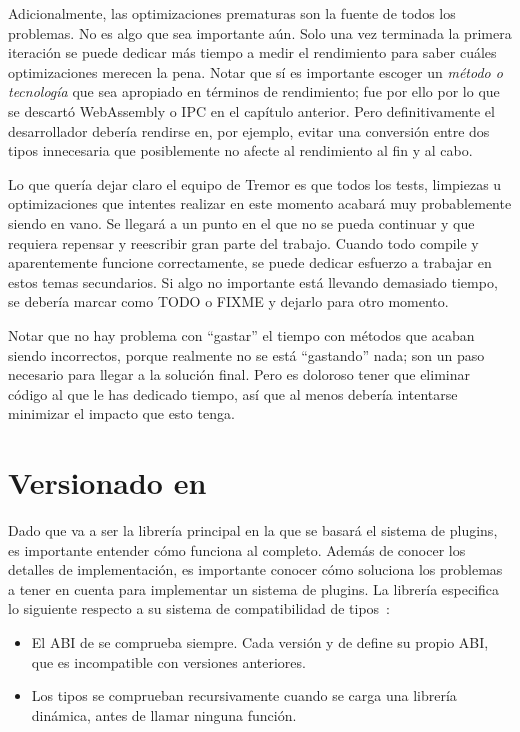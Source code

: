 Adicionalmente, las optimizaciones prematuras son la fuente de todos los
problemas. No es algo que sea importante aún. Solo una vez terminada la primera
iteración se puede dedicar más tiempo a medir el rendimiento para saber cuáles
optimizaciones merecen la pena. Notar que sí es importante escoger un
\emph{método o tecnología} que sea apropiado en términos de rendimiento; fue por
ello por lo que se descartó WebAssembly o IPC en el capítulo anterior. Pero
definitivamente el desarrollador debería rendirse en, por ejemplo, evitar una
conversión entre dos tipos innecesaria que posiblemente no afecte al rendimiento
al fin y al cabo.

Lo que quería dejar claro el equipo de Tremor es que todos los tests, limpiezas
u optimizaciones que intentes realizar en este momento acabará muy probablemente
siendo en vano. Se llegará a un punto en el que no se pueda continuar y que
requiera repensar y reescribir gran parte del trabajo. Cuando todo compile y
aparentemente funcione correctamente, se puede dedicar esfuerzo a trabajar en
estos temas secundarios. Si algo no importante está llevando demasiado tiempo,
se debería marcar como TODO o FIXME y dejarlo para otro momento.

Notar que no hay problema con ``gastar'' el tiempo con métodos que acaban siendo
incorrectos, porque realmente no se está ``gastando'' nada; son un paso
necesario para llegar a la solución final. Pero es doloroso tener que eliminar
código al que le has dedicado tiempo, así que al menos debería intentarse
minimizar el impacto que esto tenga.

\section{Versionado en \abistable}

Dado que \abistable va a ser la librería principal en la que se basará el
sistema de plugins, es importante entender cómo funciona al completo. Además de
conocer los detalles de implementación, es importante conocer cómo \abistable
soluciona los problemas a tener en cuenta para implementar un sistema de
plugins. La librería especifica lo siguiente respecto a su sistema de
compatibilidad de tipos~\cite{abistable_safety}:

\begin{itemize}
    \item El ABI de \abistable se comprueba siempre. Cada versión  y
         de \abistable define su propio ABI, que es incompatible
        con versiones anteriores.

    \item Los tipos se comprueban recursivamente cuando se carga una librería
        dinámica, antes de llamar ninguna función.

\end{itemize}

